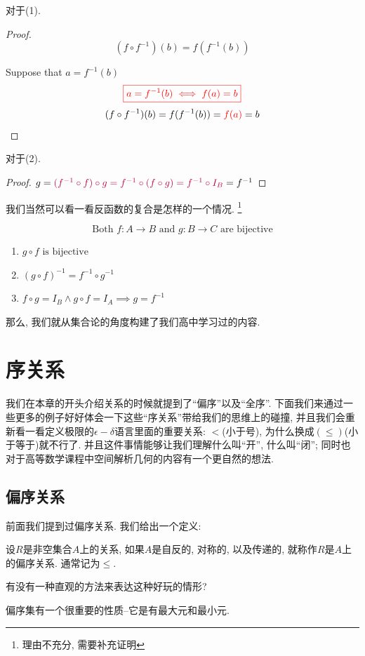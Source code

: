 对于(1). 
\begin{proof}
  \[
    (f \circ f^{-1})(b) = f(f^{-1}(b))
  \]

    Suppose that $a = f^{-1}(b)$
    \[
      \textcolor{red}{\boxed{a = f^{-1}(b) \iff f(a) = b}}
    \]
    \[
    (f \circ f^{-1})(b) = f(f^{-1}(b)) = \textcolor{red}{f(a)} = b
  \]
\end{proof}

对于(2).
\begin{proof}
  $g = \textcolor{purple}{(f^{-1} \circ f) \circ g = f^{-1} \circ (f \circ g) = f^{-1} \circ I_B} = f^{-1}$
\end{proof}

我们当然可以看一看反函数的复合是怎样的一个情况. \footnote{理由不充分, 需要补充证明}

\begin{theorem}
  \[
    \text{Both } f: A \to B \text{ and } g: B \to C \text{ are bijective}
  \]

  \begin{enumerate}
    \item $g \circ f \text{ is bijective}$
    \item $(g \circ f)^{-1} = f^{-1} \circ g^{-1}$
    \item $f \circ g = I_B \land g \circ f = I_A \implies g = f^{-1}$
  \end{enumerate}
\end{theorem}

那么, 我们就从集合论的角度构建了我们高中学习过的内容. 

\section{序关系}

我们在本章的开头介绍关系的时候就提到了``偏序''以及``全序''. 下面我们来通过一些更多的例子好好体会一下这些``序关系''带给我们的思维上的碰撞, 并且我们会重新看一看定义极限的$\epsilon-\delta$语言里面的重要关系: $<$(小于号), 为什么换成$(\leq)$(小于等于)就不行了. 并且这件事情能够让我们理解什么叫``开'', 什么叫``闭''; 同时也对于高等数学课程中空间解析几何的内容有一个更自然的想法. 

\subsection{偏序关系}

前面我们提到过偏序关系. 我们给出一个定义: 

\begin{definition}
	设$R$是非空集合$A$上的关系, 如果$A$是自反的, 对称的, 以及传递的, 就称作$R$是$A$上的偏序关系. 通常记为$\leq$. 
\end{definition}

\begin{bonus}
	有没有一种直观的方法来表达这种好玩的情形? 
\end{bonus}

偏序集有一个很重要的性质--它是有最大元和最小元. 

